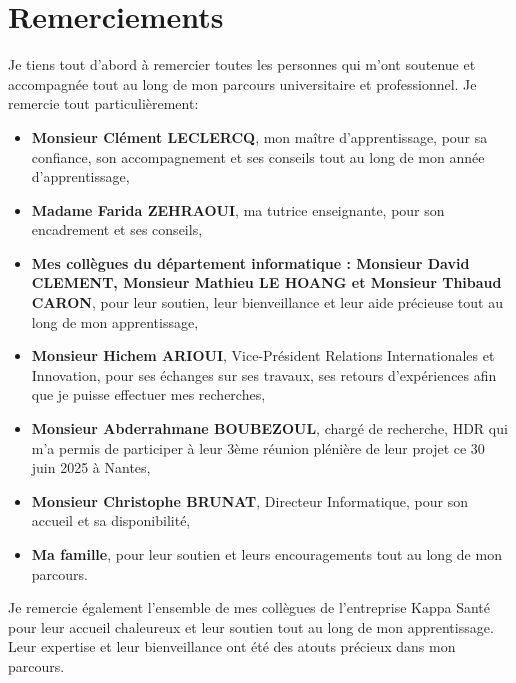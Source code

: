 \section{Remerciements}
Je tiens tout d'abord à remercier toutes les personnes qui m'ont soutenue et accompagnée tout au long de mon parcours universitaire et professionnel. 
Je remercie tout particulièrement: \
\begin{itemize}
    \item \textbf{Monsieur Clément LECLERCQ}, mon maître d'apprentissage, pour sa confiance, son accompagnement et ses conseils tout au long de mon année d'apprentissage,
    \item \textbf{Madame Farida ZEHRAOUI}, ma tutrice enseignante, pour son encadrement et ses conseils,
     \item \textbf{Mes collègues du département informatique : Monsieur David CLEMENT, Monsieur Mathieu LE HOANG et Monsieur Thibaud CARON}, pour leur soutien, leur bienveillance et leur aide précieuse tout au long de mon apprentissage,
    \item \textbf{Monsieur Hichem ARIOUI}, Vice-Président Relations Internationales et Innovation, pour ses échanges sur ses travaux, ses retours d'expériences afin que je puisse effectuer mes recherches,
    \item \textbf{Monsieur Abderrahmane BOUBEZOUL}, chargé de recherche, HDR qui m'a permis de participer à leur 3ème réunion plénière de leur projet ce 30 juin 2025 à Nantes,
    \item \textbf{Monsieur Christophe BRUNAT}, Directeur Informatique, pour son accueil et sa disponibilité,
    \item \textbf{Ma famille}, pour leur soutien et leurs encouragements tout au long de mon parcours.
\end{itemize}
\vspace{0.5cm}
Je remercie également l'ensemble de mes collègues de l'entreprise Kappa Santé pour leur accueil chaleureux et leur soutien tout au long de mon apprentissage. Leur expertise et leur bienveillance ont été des atouts précieux dans mon parcours.